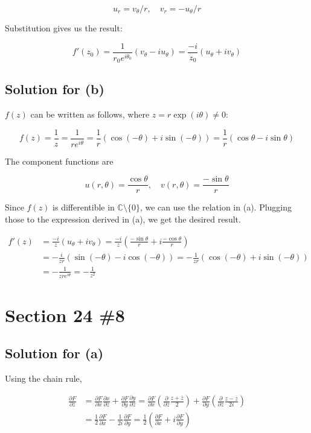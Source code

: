 \documentclass{scrartcl}
\begin{document}
\[
  u_r = v_\theta / r, \quad v_r = -u_\theta / r
\]

Substitution gives us the result:

\[
  f'(z_0) = \frac{1}{r_0 e^{i\theta_0}} (v_\theta - iu_\theta) = \frac{-i}{z_0} (u_\theta + iv_\theta)
\]

\subsection{Solution for (b)}
\(f(z)\) can be written as follows, where \(z = r\exp(i\theta) \not = 0\):

\[
  f(z) = \frac{1}{z} = \frac{1}{r e^{i\theta}} = \frac{1}{r} (\cos (-\theta) + i\sin (-\theta)) = \frac{1}{r} (\cos \theta - i\sin \theta)
\]

The component functions are

\[
  u(r, \theta) = \frac{\cos \theta}{r}, \quad v(r, \theta) = \frac{-\sin \theta}{r}
\]

Since \(f(z)\) is differentible in \(\mathbb{C} \setminus \{0\}\), we can use the relation in (a).
Plugging those to the expression derived in (a), we get the desired result.

\begin{align*}
  f'(z) &= \frac{-i}{z} (u_\theta + iv_\theta) = \frac{-i}{z} \left(\frac{-\sin \theta}{r} + i \frac{-\cos \theta}{r}\right) \\
  &= -\frac{i}{zr} \left( \sin(-\theta) - i\cos(-\theta) \right) = -\frac{1}{zr} (\cos(-\theta) + i\sin(-\theta)) \\
  &= -\frac{1}{zre^{i\theta}} = -\frac{1}{z^2}
\end{align*}

\section{Section 24 \#8}
\subsection{Solution for (a)}
Using the chain rule,

\begin{align*}
  \frac{\partial F}{\partial \overline{z}} &= \frac{\partial F}{\partial x} \frac{\partial x}{\partial \overline{z}} + \frac{\partial F}{\partial y} \frac{\partial y}{\partial \overline{z}} = \frac{\partial F}{\partial x} \left( \frac{\partial}{\partial \overline{z}} \frac{z + \overline{z}}{2} \right) + \frac{\partial F}{\partial y} \left( \frac{\partial}{\partial \overline{z}} \frac{z - \overline{z}}{2i} \right) \\
 &= \frac{1}{2} \frac{\partial F}{\partial x} - \frac{1}{2i} \frac{\partial F}{\partial y} = \frac{1}{2} \left( \frac{\partial F}{\partial x} + i \frac{\partial F}{\partial y} \right)
\end{align*}
\end{document}
